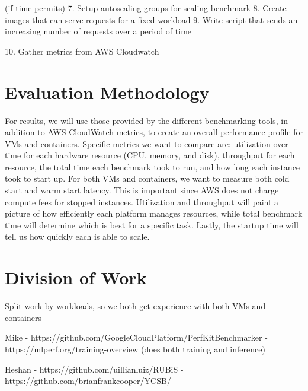 \documentclass[11pt]{article}
\begin{document}
(if time permits)
7. Setup autoscaling groups for scaling benchmark
8. Create images that can serve requests for a fixed workload
9. Write script that sends an increasing number of requests over a period of time

10. Gather metrics from AWS Cloudwatch

\section{Evaluation Methodology}

For results, we will use those provided by the different benchmarking tools, in addition to AWS CloudWatch metrics, to create an overall performance profile for VMs and containers. Specific metrics we want to compare are: utilization over time for each hardware resource (CPU, memory, and disk), throughput for each resource, the total time each benchmark took to run, and how long each instance took to start up. For both VMs and containers, we want to measure both cold start and warm start latency. This is important since AWS does not charge compute fees for stopped instances. Utilization and throughput will paint a picture of how efficiently each platform manages resources, while total benchmark time will determine which is best for a specific task. Lastly, the startup time will tell us how quickly each is able to scale.

\section{Division of Work}

Split work by workloads, so we both get experience with both VMs and containers

Mike
  - https://github.com/GoogleCloudPlatform/PerfKitBenchmarker
  - https://mlperf.org/training-overview (does both training and inference)

Heshan
  - https://github.com/uillianluiz/RUBiS
  - https://github.com/brianfrankcooper/YCSB/
\end{document}
